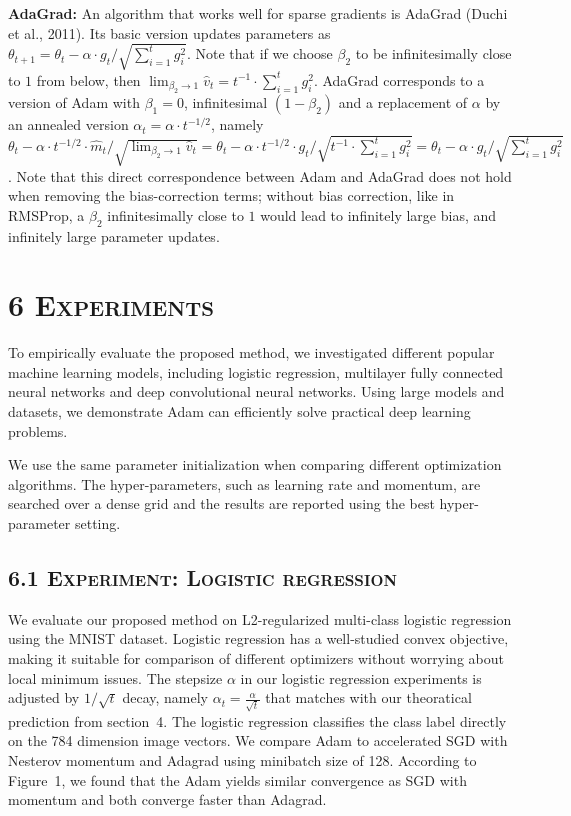 \documentclass[11pt]{article}
\begin{document}
\vspace{0.5em}

\noindent\textbf{AdaGrad:} An algorithm that works well for
sparse gradients is AdaGrad (Duchi et al., 2011). Its basic
version updates parameters as
$\theta_{t+1} = \theta_t - \alpha \cdot g_t / \sqrt{\sum_{i=1}^{t} g_i^2}$.
Note that if we choose $\beta_2$ to be infinitesimally close to
$1$ from below, then
$\lim_{\beta_2 \to 1} \widehat{v}_t = t^{-1} \cdot \sum_{i=1}^{t} g_i^2$.
AdaGrad corresponds to a version of Adam with $\beta_1 = 0$,
infinitesimal $(1 - \beta_2)$ and a replacement of $\alpha$ by an
annealed version $\alpha_t = \alpha \cdot t^{-1/2}$, namely
$\theta_t - \alpha \cdot t^{-1/2} \cdot \widehat{m}_t / \sqrt{\lim_{\beta_2 \to 1} \widehat{v}_t}
 = \theta_t - \alpha \cdot t^{-1/2} \cdot g_t / \sqrt{t^{-1} \cdot \sum_{i=1}^{t} g_i^2}
 = \theta_t - \alpha \cdot g_t / \sqrt{\sum_{i=1}^{t} g_i^2}$.
Note that this direct correspondence between Adam and AdaGrad
does not hold when removing the bias-correction terms; without
bias correction, like in RMSProp, a $\beta_2$ infinitesimally
close to $1$ would lead to infinitely large bias, and infinitely
large parameter updates.

\vspace{0.5em}

\section*{6 \textsc{Experiments}}

To empirically evaluate the proposed method, we investigated
different popular machine learning models, including logistic
regression, multilayer fully connected neural networks and deep
convolutional neural networks. Using large models and datasets,
we demonstrate Adam can efficiently solve practical deep learning
problems.

We use the same parameter initialization when comparing different
optimization algorithms. The hyper-parameters, such as learning
rate and momentum, are searched over a dense grid and the results
are reported using the best hyper-parameter setting.

\subsection*{6.1 \textsc{Experiment: Logistic regression}}

We evaluate our proposed method on L2-regularized multi-class
logistic regression using the MNIST dataset. Logistic regression
has a well-studied convex objective, making it suitable for
comparison of different optimizers without worrying about local
minimum issues. The stepsize $\alpha$ in our logistic regression
experiments is adjusted by $1/\sqrt{t}$ decay, namely
$\alpha_t = \frac{\alpha}{\sqrt{t}}$ that matches with our
theoratical prediction from section~4. The logistic regression
classifies the class label directly on the 784 dimension image
vectors. We compare Adam to accelerated SGD with Nesterov
momentum and Adagrad using minibatch size of 128. According to
Figure~1, we found that the Adam yields similar convergence as
SGD with momentum and both converge faster than Adagrad.
\end{document}
